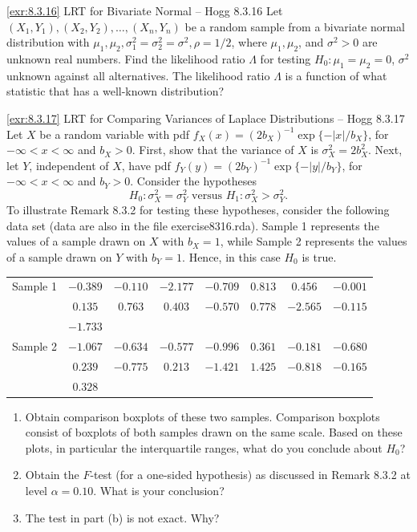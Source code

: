 \begin{exercise}{\ref{exr:8.3.16} LRT for Bivariate Normal -- Hogg 8.3.16}\label{exr:8.3.16}
Let $(X_1, Y_1), (X_2, Y_2), \ldots, (X_n, Y_n)$ be a random sample from a bivariate normal distribution with $\mu_1, \mu_2, \sigma_1^2 = \sigma_2^2 = \sigma^2, \rho = 1/2$, where $\mu_1, \mu_2$, and $\sigma^2 > 0$ are unknown real numbers. Find the likelihood ratio $\Lambda$ for testing $H_0: \mu_1 = \mu_2 = 0$, $\sigma^2$ unknown against all alternatives. The likelihood ratio $\Lambda$ is a function of what statistic that has a well-known distribution?
\end{exercise}

\begin{exercise}{\ref{exr:8.3.17} LRT for Comparing Variances of Laplace Distributions -- Hogg 8.3.17}\label{exr:8.3.17}
Let $X$ be a random variable with pdf $f_X(x) = (2b_X)^{-1}\exp\{-|x|/b_X\}$, for $-\infty < x < \infty$ and $b_X > 0$. First, show that the variance of $X$ is $\sigma_X^2 = 2b_X^2$. Next, let $Y$, independent of $X$, have pdf $f_Y(y) = (2b_Y)^{-1}\exp\{-|y|/b_Y\}$, for $-\infty < x < \infty$ and $b_Y > 0$. Consider the hypotheses
\[
H_0: \sigma_X^2 = \sigma_Y^2 \text{ versus } H_1: \sigma_X^2 > \sigma_Y^2.
\]
To illustrate Remark 8.3.2 for testing these hypotheses, consider the following data set (data are also in the file exercise8316.rda). Sample 1 represents the values of a sample drawn on $X$ with $b_X = 1$, while Sample 2 represents the values of a sample drawn on $Y$ with $b_Y = 1$. Hence, in this case $H_0$ is true.

\begin{tabular}{l|ccccccc}
Sample 1 & $-0.389$ & $-0.110$ & $-2.177$ & $-0.709$ & $0.813$ & $0.456$ & $-0.001$ \\
& $0.135$ & $0.763$ & $0.403$ & $-0.570$ & $0.778$ & $-2.565$ & $-0.115$ \\
& $-1.733$ & & & & & & \\
\hline
Sample 2 & $-1.067$ & $-0.634$ & $-0.577$ & $-0.996$ & $0.361$ & $-0.181$ & $-0.680$ \\
& $0.239$ & $-0.775$ & $0.213$ & $-1.421$ & $1.425$ & $-0.818$ & $-0.165$ \\
& $0.328$ & & & & & & \\
\end{tabular}

\begin{enumerate}
\item[(a)] Obtain comparison boxplots of these two samples. Comparison boxplots consist of boxplots of both samples drawn on the same scale. Based on these plots, in particular the interquartile ranges, what do you conclude about $H_0$?
\item[(b)] Obtain the $F$-test (for a one-sided hypothesis) as discussed in Remark 8.3.2 at level $\alpha = 0.10$. What is your conclusion?
\item[(c)] The test in part (b) is not exact. Why?
\end{enumerate}
\end{exercise}

